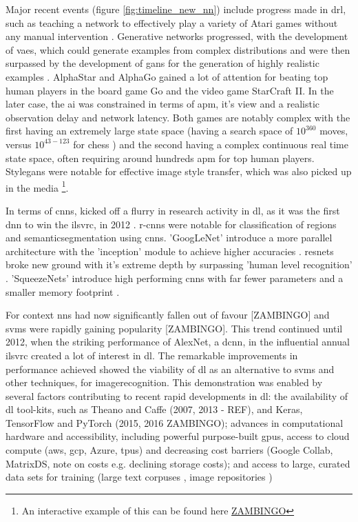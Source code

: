 Major recent events (figure \ref{fig:timeline_new_nn}) include progress made in \gls{drl}, such as teaching a network to effectively play a variety of Atari games without any manual intervention \cite{drl_atari}. Generative networks progressed, with the development of \gls{vae}s, which could generate examples from complex distributions and were then surpassed by the development of \gls{gan}s for the generation of highly realistic examples \cite{gans}. AlphaStar \cite{alphastar} and AlphaGo \cite{alphago} gained a lot of attention \cite{press_alpha_go} \cite{press_alpha_star} for beating top human players in the board game Go and the video game StarCraft II. In the later case, the \gls{ai} was constrained in terms of \gls{apm}, it's view and a realistic observation delay and network latency. Both games are notably complex with the first having an extremely large state space (having a search space of $10^360$ moves, versus $10^{43-123}$ for chess \cite{moves_chess_go}) and the second having a complex continuous real time state space, often requiring  around hundreds \gls{apm} \cite{sc_apm} for top human players. Style\gls{gan}s were notable for effective image style transfer, which was also picked up in the media \cite{press_stylegan} \footnote{An interactive example of this can be found here \url{ZAMBINGO}}.

In terms of \gls{cnn}s, kicked off a flurry in research activity in \gls{dl}, as it was the first \gls{dnn} to win the \gls{ilsvrc}, in 2012 \cite{alex_net} \cite{dl_overview}. \gls{r-cnn}s were notable for classification of regions and \gls{semanticsegmentation} using \gls{cnn}s. 'GoogLeNet' introduce a more parallel architecture with the 'inception' module to achieve higher accuracies \cite{googlenet}. \gls{resnet}s broke new ground with it's extreme depth \cite{resnet} by surpassing 'human level recognition' \cite{resnet_human}. 'SqueezeNets' introduce high performing \gls{cnn}s with far fewer parameters and a smaller memory footprint \cite{squeeze_net}. 
\bigskip

For context \gls{nn}s had now significantly fallen out of favour [ZAMBINGO] and \gls{svm}s were rapidly gaining popularity [ZAMBINGO]. This trend continued until 2012, when the striking performance of AlexNet, a \gls{dcnn}, in the influential annual \gls{ilsvrc} created a lot of interest in \gls{dl}. The remarkable improvements in performance achieved showed the viability of \gls{dl} as an alternative to \gls{svm}s and other techniques, for \gls{imagerecognition}. This demonstration was enabled by several factors contributing to recent rapid developments in \gls{dl}: the availability of \gls{dl} tool-kits, such as Theano and Caffe (2007, 2013 - REF), and Keras, TensorFlow and PyTorch (2015, 2016 ZAMBINGO); advances in computational hardware and accessibility, including powerful purpose-built \gls{gpu}s, access to cloud compute (\gls{aws}, \gls{gcp}, Azure, \gls{tpu}s) and decreasing cost barriers (Google Collab, MatrixDS, note on costs e.g. declining storage costs); and access to large, curated data sets for training (large text corpuses \cite{enron_emails}, image repositories \cite{image_net}) \bigskip

